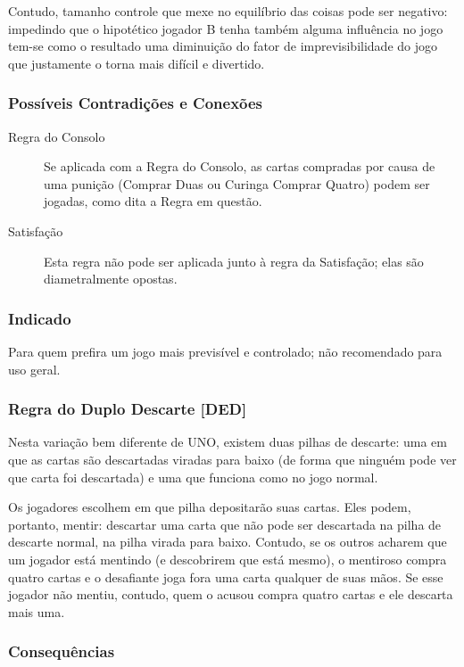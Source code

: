 Contudo, tamanho controle que mexe no equilíbrio das coisas pode ser negativo: impedindo que o hipotético jogador B tenha também alguma influência no jogo tem-se como o resultado uma diminuição do fator de imprevisibilidade do jogo que justamente o torna mais difícil e divertido.

\subsubsection{Possíveis Contradições e Conexões}

\begin{description}
\item[Regra do Consolo]{Se aplicada com a Regra do Consolo, as cartas compradas por causa de uma punição (Comprar Duas ou Curinga Comprar Quatro) podem ser jogadas, como dita a Regra em questão.}
\item[Satisfação]{Esta regra não pode ser aplicada junto à regra da Satisfação; elas são diametralmente opostas.}
\end{description}

\subsubsection{Indicado} 

Para quem prefira um jogo mais previsível e controlado; não recomendado para uso geral.

\subsubsection{Regra do Duplo Descarte [DED]}

Nesta variação bem diferente de UNO, existem duas pilhas de descarte: uma em que as cartas são descartadas viradas para baixo (de forma que ninguém pode ver que carta foi descartada) e uma que funciona como no jogo normal.

Os jogadores escolhem em que pilha depositarão suas cartas. Eles podem, portanto, mentir: descartar uma carta que não pode ser descartada na pilha de descarte normal, na pilha virada para baixo. Contudo, se os outros acharem que um jogador está mentindo (e descobrirem que está mesmo), o mentiroso compra quatro cartas e o desafiante joga fora uma carta qualquer de suas mãos. Se esse jogador não mentiu, contudo, quem o acusou compra quatro cartas e ele descarta mais uma.

\subsubsection{Consequências}

